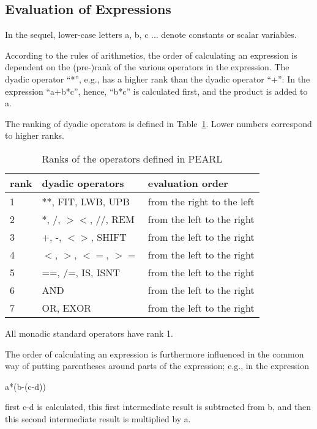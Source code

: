 \subsection{Evaluation of Expressions}   %

In the sequel, lower-case letters a, b, c ... denote constants or scalar
variables.

According to the rules of arithmetics, the order of calculating an
expression is dependent on the \mbox{(pre-)}rank of the various operators in
the expression. The dyadic operator ``*'', e.g., has a higher rank than
the dyadic operator ``+'': In the expression ``a+b*c'', hence, ``b*c''
is calculated first, and the product is added to a.

The ranking of dyadic operators is defined in Table~\ref{ranks}. Lower
numbers correspond to higher ranks.

\begin{table}
\begin{center}
\caption{Ranks of the operators defined in PEARL}
\label{ranks}
\vspace{5mm}
\begin{tabular}{|l@{\x}|l@{\x}|l|}
\hline
rank & dyadic operators       & evaluation order \\ \hline
1    & **, FIT, LWB, UPB      & from the right to the left\\
2    & *, /, $><$, //, REM    & from the left to the right\\
3    & +, -, $<>$, SHIFT      & from the left to the right\\
4    & $<$, $>$, $<=$, $>=$   & from the left to the right\\
5    & ==, /=, IS, ISNT       & from the left to the right\\
6    & AND                    & from the left to the right\\
7    & OR, EXOR               & from the left to the right\\
\hline
\end{tabular}
\end{center}
\end{table}

All monadic standard operators have rank 1.

The order of calculating an expression is furthermore influenced in the
common way of putting parentheses around parts of the expression; e.g.,
in the expression

a*(b-(c-d))

first c-d is calculated, this first intermediate result is subtracted
from b, and then this second intermediate result is multiplied by a.

